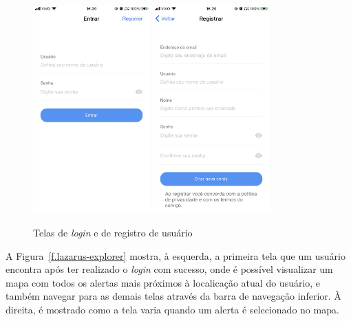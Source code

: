 \begin{figure}[htbp]
	\caption{\small Telas de \emph{login} e de registro de usuário} 
	\begin{center}
		\includegraphics[height=8cm]{images/lazarus-sign-in.png} \quad
		\includegraphics[height=8cm]{images/lazarus-sign-up.png}
	\end{center}
	\label{f.lazarus-sign}
\end{figure}

\FloatBarrier

A Figura~\ref{f.lazarus-explorer} mostra, à esquerda, a primeira tela que um usuário encontra após ter realizado o \emph{login} com sucesso, onde é possível visualizar um mapa com todos os alertas mais próximos à localicação atual do usuário, e também navegar para as demais telas através da barra de navegação inferior. À direita, é mostrado como a tela varia quando um alerta é selecionado no mapa.

